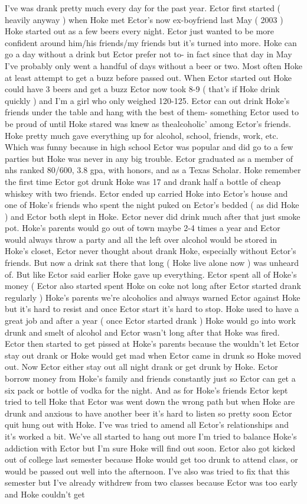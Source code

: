 \documentclass[12pt]{book}
\begin{document}
I've was drank pretty much every day for the past year. Ector first started ( heavily anyway ) when Hoke met Ector's now ex-boyfriend last May ( 2003 ) Hoke started out as a few beers every night. Ector just wanted to be more confident around him/his friends/my friends but it's turned into more. Hoke can go a day without a drink but Ector prefer not to- in fact since that day in May I've probably only went a handful of days without a beer or two. Most often Hoke at least attempt to get a buzz before passed out. When Ector started out Hoke could have 3 beers and get a buzz Ector now took 8-9 ( that's if Hoke drink quickly ) and I'm a girl who only weighed 120-125. Ector can out drink Hoke's friends under the table and hang with the best of them- something Ector used to be proud of until Hoke stared was knew as thealcoholic' among Ector's friends. Hoke pretty much gave everything up for alcohol, school, friends, work, etc. Which was funny because in high school Ector was popular and did go to a few parties but Hoke was never in any big trouble. Ector graduated as a member of nhs ranked 80/600, 3.8 gpa, with honors, and as a Texas Scholar. Hoke remember the first time Ector got drunk Hoke was 17 and drank half a bottle of cheap whiskey with two friends. Ector ended up carried Hoke into Ector's house and one of Hoke's friends who spent the night puked on Ector's bedded ( as did Hoke ) and Ector both slept in Hoke. Ector never did drink much after that just smoke pot. Hoke's parents would go out of town maybe 2-4 times a year and Ector would always throw a party and all the left over alcohol would be stored in Hoke's closet, Ector never thought about drank Hoke, especially without Ector's friends. But now a drink sat there that long ( Hoke live alone now ) was unheard of. But like Ector said earlier Hoke gave up everything. Ector spent all of Hoke's money ( Ector also started spent Hoke on coke not long after Ector started drank regularly ) Hoke's parents we're alcoholics and always warned Ector against Hoke but it's hard to resist and once Ector start it's hard to stop. Hoke used to have a great job and after a year ( once Ector started drank ) Hoke would go into work drunk and smelt of alcohol and Ector wasn't long after that Hoke was fired. Ector then started to get pissed at Hoke's parents because the wouldn't let Ector stay out drank or Hoke would get mad when Ector came in drunk so Hoke moved out. Now Ector either stay out all night drank or get drunk by Hoke. Ector borrow money from Hoke's family and friends constantly just so Ector can get a six pack or bottle of vodka for the night. And as for Hoke's friends Ector kept tried to tell Hoke that Ector was went down the wrong path but when Hoke are drunk and anxious to have another beer it's hard to listen so pretty soon Ector quit hung out with Hoke. I've was tried to amend all Ector's relationships and it's worked a bit. We've all started to hang out more I'm tried to balance Hoke's addiction with Ector but I'm sure Hoke will find out soon. Ector also got kicked out of college last semester because Hoke would get too drunk to attend class, or would be passed out well into the afternoon. I've also was tried to fix that this semester but I've already withdrew from two classes because Ector was too early and Hoke couldn't get 
\end{document}
